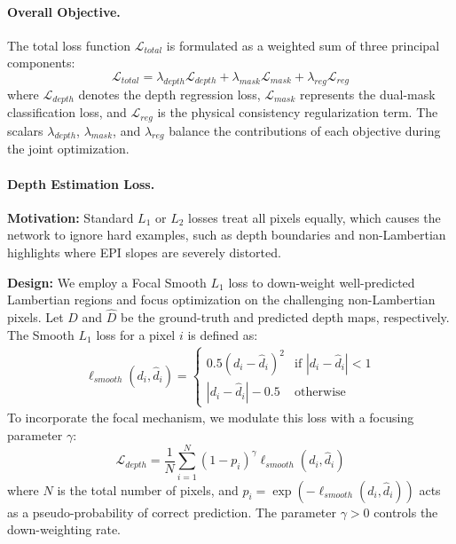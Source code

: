 \paragraph{Overall Objective.}
The total loss function $\mathcal{L}_{total}$ is formulated as a weighted sum of three principal components:
\begin{equation}
\label{eq:eq16}
\mathcal{L}_{total} = \lambda_{depth} \mathcal{L}_{depth} + \lambda_{mask} \mathcal{L}_{mask} + \lambda_{reg} \mathcal{L}_{reg}
\end{equation}
where $\mathcal{L}_{depth}$ denotes the depth regression loss, $\mathcal{L}_{mask}$ represents the dual-mask classification loss, and $\mathcal{L}_{reg}$ is the physical consistency regularization term. The scalars $\lambda_{depth}$, $\lambda_{mask}$, and $\lambda_{reg}$ balance the contributions of each objective during the joint optimization.

\paragraph{Depth Estimation Loss.}
\textbf{Motivation:} Standard $L_1$ or $L_2$ losses treat all pixels equally, which causes the network to ignore hard examples, such as depth boundaries and non-Lambertian highlights where EPI slopes are severely distorted. 

\textbf{Design:} We employ a Focal Smooth $L_1$ loss to down-weight well-predicted Lambertian regions and focus optimization on the challenging non-Lambertian pixels. Let $D$ and $\hat{D}$ be the ground-truth and predicted depth maps, respectively. The Smooth $L_1$ loss for a pixel $i$ is defined as:
\begin{align}
\ell_{smooth}(d_i, \hat{d}_i) = \begin{cases} 0.5 (d_i - \hat{d}_i)^2 & \text{if } |d_i - \hat{d}_i| < 1 \\ |d_i - \hat{d}_i| - 0.5 & \text{otherwise} \end{cases}
\end{align}
To incorporate the focal mechanism, we modulate this loss with a focusing parameter $\gamma$:
\begin{equation}
\label{eq:eq17}
\mathcal{L}_{depth} = \frac{1}{N} \sum_{i=1}^{N} (1 - p_i)^\gamma \ell_{smooth}(d_i, \hat{d}_i)
\end{equation}
where $N$ is the total number of pixels, and $p_i = \exp(-\ell_{smooth}(d_i, \hat{d}_i))$ acts as a pseudo-probability of correct prediction. The parameter $\gamma > 0$ controls the down-weighting rate. 

